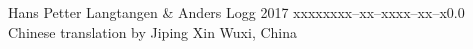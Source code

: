 \documentclass{tstextbook}
\begin{document}
       {Hans Petter Langtangen \& Anders Logg}
       {}
       {2017}
       {xxxxx}{xxx--xx--xxxx--xx--x}{0.0}
       {Chinese translation by Jiping Xin}
       {Wuxi, China}














\printindex
\end{document}
